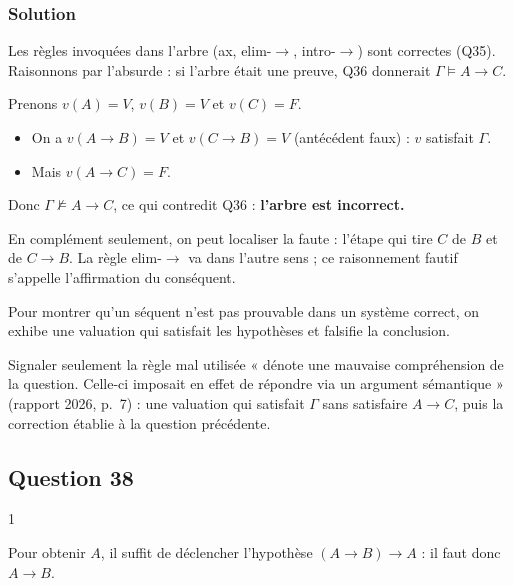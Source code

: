 \documentclass[11pt,a4paper]{article}
\providecommand{\tightlist}{\setlength{\itemsep}{0pt}\setlength{\parskip}{0pt}}
\begin{document}
\hypertarget{solution-36}{%
\subsubsection{Solution}\label{solution-36}}

Les règles invoquées dans l'arbre (ax, elim-\(\to\), intro-\(\to\)) sont correctes (Q35). Raisonnons par l'absurde : si l'arbre était une preuve, Q36 donnerait \(\Gamma \models A \to C\).

Prenons \(v(A) = V\), \(v(B) = V\) et \(v(C) = F\).

\begin{itemize}
\tightlist
\item
  On a \(v(A \to B) = V\) et \(v(C \to B) = V\) (antécédent faux) : \(v\) satisfait \(\Gamma\).
\item
  Mais \(v(A \to C) = F\).
\end{itemize}

Donc \(\Gamma \not\models A \to C\), ce qui contredit Q36 : \textbf{l'arbre est incorrect.}

En complément seulement, on peut localiser la faute : l'étape qui tire \(C\) de \(B\) et de \(C \to B\). La règle elim-\(\to\) va dans l'autre sens ; ce raisonnement fautif s'appelle l'affirmation du conséquent.

\begin{methode}

Pour montrer qu'un séquent n'est pas prouvable dans un système correct, on exhibe une valuation qui satisfait les hypothèses et falsifie la conclusion.

\end{methode}

\begin{jury}

Signaler seulement la règle mal utilisée « dénote une mauvaise compréhension de la question. Celle-ci imposait en effet de répondre via un argument sémantique » (rapport 2026, p.~7) : une valuation qui satisfait \(\Gamma\) sans satisfaire \(A \to C\), puis la correction établie à la question précédente.

\end{jury}

\hypertarget{question-38}{%
\subsection{Question 38}\label{question-38}}

\begin{indication}{1}

Pour obtenir \(A\), il suffit de déclencher l'hypothèse \((A \to B) \to A\) : il faut donc \(A \to B\).

\end{indication}
\end{document}
